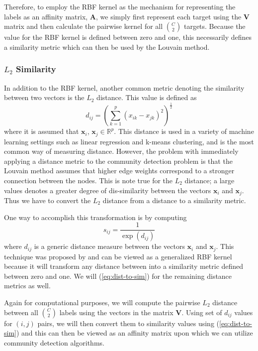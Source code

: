 \documentclass[../thesis.tex]{subfiles}
\begin{document}
Therefore, to employ the RBF kernel as the mechanism for representing the labels
as an affinity matrix, $\mathbf{A}$, we simply first represent each target using
the $\mathbf{V}$ matrix and then calculate the pairwise kernel for all
$\binom{C}{2}$ targets. Because the value for the RBF kernel is defined between
zero and one, this necessarily defines a similarity metric which can then be
used by the Louvain method.

\subsubsection{$L_2$ Similarity}
In addition to the RBF kernel, another common metric denoting the similarity
between two vectors is the $L_2$ distance. This value is defined as
\begin{equation}
    d_{ij} = \left(\sum_{k=1}^p (x_{ik} - x_{jk})^2 \right)^{\frac{1}{2}}
\end{equation}
where it is assumed that $\mathbf{x}_i$, $\mathbf{x}_j \in \mathbb{R}^p$. This
distance is used in a variety of machine learning settings such as linear
regression and k-means clustering, and is the most common way of measuring
distance. However, the problem with immediately applying a distance metric to
the community detection problem is that the Louvain method assumes that higher
edge weights correspond to a stronger connection between the nodes. This is note
true for the $L_2$ distance; a large values denotes a greater degree of
dis-similarity between the vectors $\mathbf{x}_i$ and $\mathbf{x}_j$. Thus we
have to convert the $L_2$ distance from a distance to a similarity metric.

One way to accomplish this transformation is by computing
\begin{equation}
    \label{eq:dist-to-sim}
    s_{ij} = \frac{1}{\exp(d_{ij})}
\end{equation}
where $d_{ij}$ is a generic distance measure between the vectors $\mathbf{x}_i$
and $\mathbf{x}_j$. This technique was proposed by \cite{haasdonk2004learning}
and can be viewed as a generalized RBF kernel because it will transform any
distance between into a similarity metric defined between zero and one. We will
(\ref{eq:dist-to-sim}) for the remaining distance metrics as well.

Again for computational purposes, we will compute the pairwise $L_2$ distance
between all $\binom{C}{2}$ labels using the vectors in the matrix $\mathbf{V}$.
Using set of $d_{ij}$ values for $(i,j)$ pairs, we will then convert them to
similarity values using (\ref{eq:dist-to-sim}) and this can then be viewed as an
affinity matrix upon which we can utilize community detection algorithms.
\end{document}
